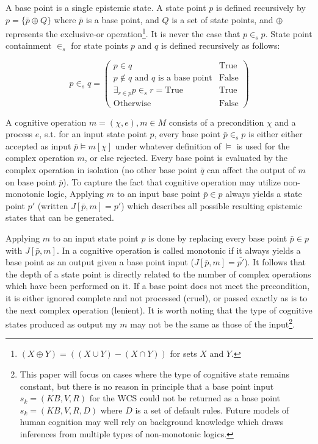 \documentclass{article}
\begin{document}
A base point is a single epistemic state. A state point $p$ is defined recursively by $p=\{\bar{p} \oplus Q \}$ where $\bar{p}$ is a base point, and $Q$ is a set of state points, and $\oplus$ represents the exclusive-or operation\footnote{$(X \oplus Y) = ((X \cup Y) - (X \cap Y))$ for sets $X$ and $Y$.}. It is never the case that $p \in_s p$. State point containment $\in_s$ for state points $p$ and $q$ is defined recursively as follows:

\[
p \in_s q = \begin{pmatrix} p \in q  & \textrm{True} \\ p \not\in q \textrm{ and } q \textrm{ is a base point} & \textrm{False}  \\  \exists_{r\in p}p \in_s r = \textrm{True} & \textrm{True}   \\ \textrm{Otherwise} & \textrm{False} \end{pmatrix}
\]


A cognitive operation $m = (\chi, e), m \in M$ consists of a precondition $\chi$ and a process $e$, s.t. for an input state point $p$, every base point $\bar{p} \in_s p$ is either either accepted as input $\bar{p} \models m[\chi]$ under whatever definition of $\models$ is used for the complex operation $m$, or else rejected. Every base point is evaluated by the complex operation in isolation (no other base point $\bar{q}$ can affect the output of $m$ on base point $\bar{p}$). To capture the fact that cognitive operation may utilize non-monotonic logic, Applying $m$ to an input base point $\bar{p}\in p$ always yields a state point $p'$ (written $J[\bar{p},m]=p'$) which describes all possible resulting epistemic states that can be generated. 

Applying $m$ to an input state point $p$ is done by replacing every base point $\bar{p} \in p$ with $J[\bar{p},m]$. In a cognitive operation is called monotonic if it always yields a base point as an output given a base point input ($J[\bar{p},m]=\bar{p'}$). It follows that the depth of a state point is directly related to the number of complex operations which have been performed on it. If a base point does not meet the precondition, it is either ignored complete and not processed (cruel), or passed exactly as is to the next complex operation (lenient). It is worth noting that the type of cognitive states produced as output my $m$ may not be the same as those of the input\footnote{This paper will focus on cases where the type of cognitive state remains constant, but there is no reason in principle that a base point input $s_k = (KB,V,R)$ for the WCS could not be returned as a base point $s_k = (KB,V,R,D)$ where $D$ is a set of default rules. Future models of human cognition may well rely on background knowledge which draws inferences from multiple types of non-monotonic logics.}.
\end{document}
